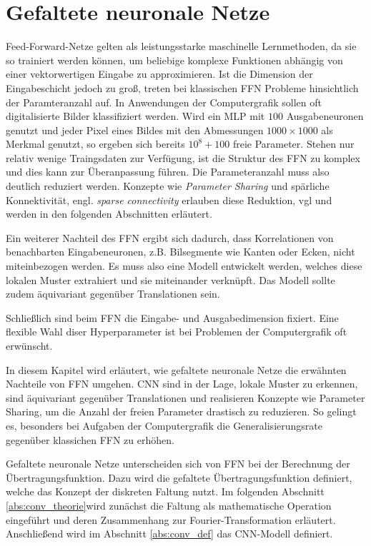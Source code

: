 \chapter{Gefaltete neuronale Netze}
\label{kap:CNN}

Feed-Forward-Netze gelten als leistungsstarke maschinelle Lernmethoden, da sie so trainiert werden können, um beliebige komplexe Funktionen abhängig von einer vektorwertigen Eingabe zu approximieren. Ist die Dimension der Eingabeschicht jedoch zu groß, treten bei klassischen FFN Probleme hinsichtlich der Paramteranzahl auf. In Anwendungen der Computergrafik sollen oft digitalisierte Bilder klassifiziert werden. Wird ein MLP mit $100$ Ausgabeneuronen genutzt und jeder Pixel eines Bildes mit den Abmessungen $1000 \times 1000$ als Merkmal genutzt, so ergeben sich bereits $10^8+100$ freie Parameter. Stehen nur relativ wenige Traingsdaten zur Verfügung, ist die Struktur des FFN zu komplex und dies kann zur Überanpassung führen\cite{caruana2000overfitting,bilbao2017overfitting}. Die Parameteranzahl muss also deutlich reduziert werden. Konzepte wie \textit{Parameter Sharing} und spärliche Konnektivität, engl. \textit{sparse connectivity} erlauben diese Reduktion, vgl \cite{Goodfellow-et-al-2016} und werden in den folgenden Abschnitten erläutert.

Ein weiterer Nachteil des FFN ergibt sich dadurch, dass Korrelationen von benachbarten Eingabeneuronen, z.B. Bilsegmente wie Kanten oder Ecken, nicht miteinbezogen werden. Es muss also eine Modell entwickelt werden, welches diese lokalen Muster extrahiert und sie miteinander verknüpft. Das Modell sollte zudem äquivariant gegenüber Translationen sein. 

Schließlich sind beim FFN die Eingabe- und Ausgabedimension fixiert. Eine flexible Wahl diser Hyperparameter ist bei Problemen der Computergrafik oft erwünscht. 

In diesem Kapitel wird erläutert, wie gefaltete neuronale Netze die erwähnten Nachteile von FFN umgehen. CNN sind in der Lage, lokale Muster zu erkennen, sind äquivariant gegenüber Translationen und realisieren Konzepte wie Parameter Sharing, um die Anzahl der freien Parameter drastisch zu reduzieren. So gelingt es, besonders bei Aufgaben der Computergrafik \cite{DBLP:conf/nips/KrizhevskySH12, DBLP:journals/pieee/LeCunBBH98,DBLP:conf/cvpr/CiresanMS12} die Generalisierungsrate gegenüber klassichen FFN zu erhöhen.

Gefaltete neuronale Netze unterscheiden sich von FFN bei der Berechnung der Übertragungsfunktion. Dazu wird die gefaltete Übertragungsfunktion definiert, welche das Konzept der diskreten Faltung nutzt. Im folgenden Abschnitt \ref{abs:conv_theorie}wird zunächst die Faltung als mathematische Operation eingeführt und deren Zusammenhang zur Fourier-Transformation \cite{werner2011funktionalanalysis} erläutert. Anschließend wird im Abschnitt \ref{abs:conv_def} das CNN-Modell definiert. 

